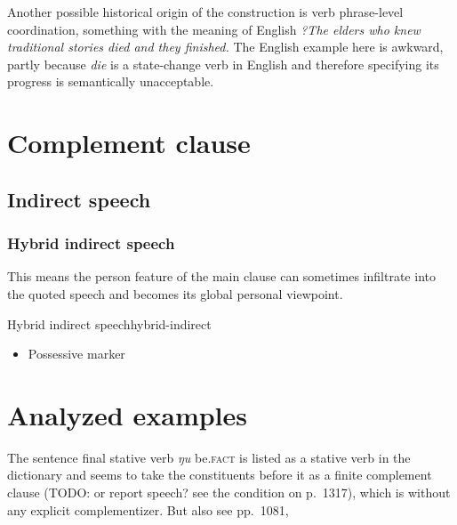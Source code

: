 \documentclass[a4paper, oneside, 12pt]{report}
\newcommand*{\citepage}[1]{p.~{#1}}
\newcommand*{\citepages}[1]{pp.~{#1}}
\newcommand{\form}[1]{\emph{#1}}
\newcommand{\category}[1]{\textsc{#1}}
\begin{document}
Another possible historical origin of the construction 
is verb phrase-level coordination,  
something with the meaning of 
English \form{?The elders who knew traditional stories died and they finished.}
The English example here is awkward, 
partly because \form{die} is a state-change verb in English 
and therefore specifying its progress is semantically unacceptable.

\chapter{Complement clause}

\section{Indirect speech}

\subsection{Hybrid indirect speech}\label{sec:complement.indirect.hybrid}

This means the person feature of the main clause
can sometimes infiltrate into the quoted speech
and becomes its global personal viewpoint.

\begin{todobox}{Hybrid indirect speech}{hybrid-indirect}
    \begin{itemize}
        \item Possessive marker
    \end{itemize}
\end{todobox}

\chapter{Analyzed examples}

The sentence final stative verb \form{ŋu} be.\category{fact} is 
listed as a stative verb in the dictionary
and seems to take the constituents before it 
as a finite complement clause (TODO: or report speech? see the condition on \citepage{1317}),
which is without any explicit complementizer. 
But also see \citepages{1081, }



\end{document}
